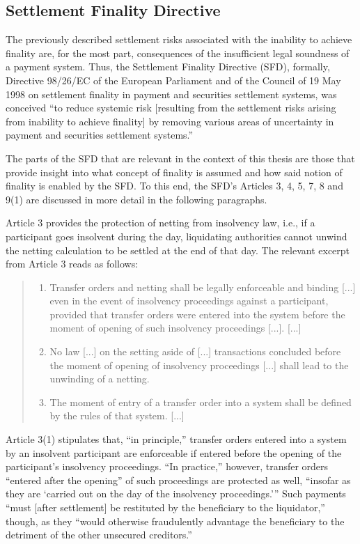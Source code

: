 \subsection{Settlement Finality Directive}

The previously described settlement risks associated with the inability to achieve finality are, for the most part, consequences of the insufficient legal soundness of a payment system.
Thus, the Settlement Finality Directive (SFD), formally, Directive 98/26/EC of the European Parliament and of the Council of 19 May 1998 on settlement finality in payment and securities settlement systems, was conceived ``to reduce systemic risk [resulting from the settlement risks arising from inability to achieve finality] by removing various areas of uncertainty in payment and securities settlement systems.'' \autocite[19]{cpmi2001}

The parts of the SFD that are relevant in the context of this thesis are those that provide insight into what concept of finality is assumed and how said notion of finality is enabled by the SFD.
To this end, the SFD's Articles 3, 4, 5, 7, 8 and 9(1) are discussed in more detail in the following paragraphs.

Article 3 provides the protection of netting from insolvency law, i.e., if a participant goes insolvent during the day, liquidating authorities cannot unwind the netting calculation to be settled at the end of that day. \autocite[19]{cpmi2001}
The relevant excerpt from Article 3 reads as follows: \autocite{eu1998sfd}

\begin{quote}
	\begin{enumerate}
		\item
			Transfer orders and netting shall be legally enforceable and binding [...] even in the event of insolvency proceedings against a participant, provided that transfer orders were entered into the system before the moment of opening of such insolvency proceedings [...]. [...]
		\item
			No law [...] on the setting aside of [...] transactions concluded before the moment of opening of insolvency proceedings [...] shall lead to the unwinding of a netting.
		\item
			The moment of entry of a transfer order into a system shall be defined by the rules of that system. [...]
	\end{enumerate}
\end{quote}

Article 3(1) stipulates that, ``in principle,'' \autocite[46]{vereecken2003} transfer orders entered into a system by an insolvent participant are enforceable if entered before the opening of the participant's insolvency proceedings.
``In practice,'' however, transfer orders ``entered after the opening'' of such proceedings are protected as well, \enquote{insofar as they are \enquote{carried out on the day of the insolvency proceedings.}}
\autocite[47]{vereecken2003}
Such payments ``must [after settlement] be restituted by the beneficiary to the liquidator,'' though, as they ``would otherwise fraudulently advantage the beneficiary to the detriment of the other unsecured creditors.'' \autocite[49]{vereecken2003}

